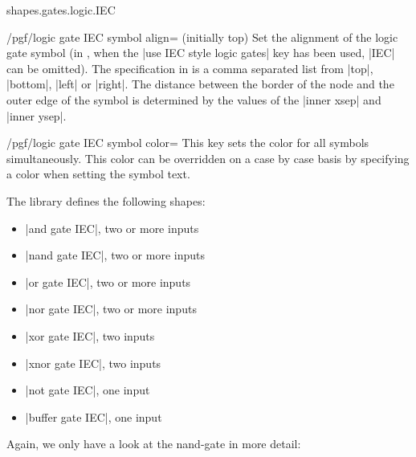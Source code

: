 \begin{pgflibrary}{shapes.gates.logic.IEC}
    \begin{key}{/pgf/logic gate IEC symbol align= (initially top)}
        Set the alignment of the logic gate symbol (in \tikzname, when the
        |use IEC style logic gates| key has been used, |IEC| can be omitted).
        The specification in  is a comma separated list from |top|,
        |bottom|, |left| or |right|. The distance between the border of the
        node and the outer edge of the symbol is determined by the values of
        the |inner xsep| and |inner ysep|.
\begin{codeexample}[]
\end{codeexample}
    \end{key}

    \begin{key}{/pgf/logic gate IEC symbol color=}
        This key sets the color for all symbols simultaneously. This color can
        be overridden on a case by case basis by specifying a color when
        setting the symbol text.
    \end{key}

    The library defines the following shapes:
    \begin{itemize}
        \item |and gate IEC|, two or more inputs
        \item |nand gate IEC|, two or more inputs
        \item |or gate IEC|, two or more inputs
        \item |nor gate IEC|, two or more inputs
        \item |xor gate IEC|, two inputs
        \item |xnor gate IEC|, two inputs
        \item |not gate IEC|, one input
        \item |buffer gate IEC|, one input
    \end{itemize}

    Again, we only have a look at the nand-gate in more detail:


\end{pgflibrary}
